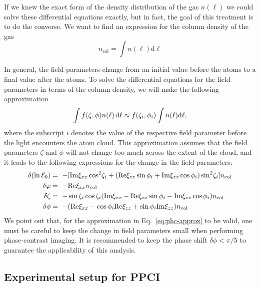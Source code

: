 If we knew the exact form of the density distribution of the gas $n(\ell)$ we
could solve these differential equations exactly,   but in fact, the goal of
this treatment is to do the converse. We want to find an expression for the
column density of the gas
\begin{equation}
  n_{\text{col}}  =  \int n(\ell) \text{d} \ell
\end{equation}

In general, the field parameters change from an initial value before the atoms
to a final value after the atoms.  To solve the differential equations for the
field parameters in terms of the column density, we will make the following
approximation 
\begin{equation}
  \int f(\zeta, \phi) n(\ell) \,\text{d} \ell \approx 
       f(\zeta_{i}, \phi_{i})  
       \int n(\ell) \text{d} \ell,
  \label{eq:phc-approx} 
\end{equation}
where the subscript $i$ denotes the value of the respective field parameter
before the light encounters the atom cloud.  This approximation assumes that
the field parameters $\zeta$ and $\phi$ will not change too much across the
extent of the cloud, and it leads to the following expressions for the change
in the field parameters:
\begin{equation}
\begin{split}
 \delta( \ln\efieldo ) & = \ 
     - [ \text{Im}\xi_{xx} \cos^{2}\!\phcChi_{i} 
       + (  \text{Re}\xi_{zz} \sin\phi_{i} + \text{Im}\xi_{zz}\cos\phi_{i} )  
             \sin^{2}\!\phcChi_{i} ] n_{\text{col}}\\ 
 \delta\varphi & = \
      -\text{Re}\xi_{xx} n_{\text{col}} \\ 
 \delta\phcChi & = \ -\sin\phcChi_{i}\cos\phcChi_{i}
     ( \text{Im}\xi_{xx}
   - \text{Re}\xi_{zz} \sin\phi_{i} - \text{Im}\xi_{zz}\cos\phi_{i} ) n_{\text{col}}\\
 \delta\phi & = \
     -( \text{Re}\xi_{xx} - \cos\phi_{i} \text{Re}\xi_{zz} 
       + \sin\phi_{i} \text{Im}\xi_{zz} )n_{\text{col}}
  \label{eq:delta-field-params}
\end{split}
\end{equation}
We point out that, for the approximation in Eq.~\ref{eq:phc-approx} to be
valid, one must be careful to keep the change in field parameters small when
performing phase-contrast imaging.  It is recommended to keep the phase shift
$\delta\phi < \pi/5$ to guarantee the applicability of this analysis. 

\subsection{Experimental setup for PPCI} 

